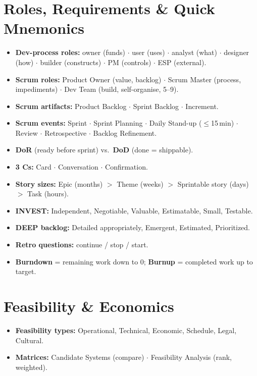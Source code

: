 \documentclass[hidelinks]{article}
\begin{document}
\section{Roles, Requirements \& Quick Mnemonics}
\begin{itemize}
  \item \textbf{Dev-process roles:} owner (funds) $\cdot$ user (uses) $\cdot$ analyst (what) $\cdot$
        designer (how) $\cdot$ builder (constructs) $\cdot$ PM (controls) $\cdot$ ESP (external).
  \item \textbf{Scrum roles:} Product Owner (value, backlog) $\cdot$ Scrum Master (process,
        impediments) $\cdot$ Dev Team (build, self-organise, 5--9).
  \item \textbf{Scrum artifacts:} Product Backlog $\cdot$ Sprint Backlog $\cdot$ Increment.
  \item \textbf{Scrum events:} Sprint $\cdot$ Sprint Planning $\cdot$ Daily Stand-up ($\le$15\,min)
        $\cdot$ Review $\cdot$ Retrospective $\cdot$ Backlog Refinement.
  \item \textbf{DoR} (ready before sprint) vs.\ \textbf{DoD} (done = shippable).
  \item \textbf{3 Cs:} Card $\cdot$ Conversation $\cdot$ Confirmation.
  \item \textbf{Story sizes:} Epic (months) $>$ Theme (weeks) $>$ Sprintable story (days) $>$ Task (hours).
  \item \textbf{INVEST:} Independent, Negotiable, Valuable, Estimatable, Small, Testable.
  \item \textbf{DEEP backlog:} Detailed appropriately, Emergent, Estimated, Prioritized.
  \item \textbf{Retro questions:} continue / stop / start.
  \item \textbf{Burndown} = remaining work down to 0; \textbf{Burnup} = completed work up to target.
\end{itemize}

\section{Feasibility \& Economics}
\begin{itemize}
  \item \textbf{Feasibility types:} Operational, Technical, Economic, Schedule, Legal, Cultural.
  \item \textbf{Matrices:} Candidate Systems (compare) $\cdot$ Feasibility Analysis (rank, weighted).
\end{itemize}
\noindent{\color{capri}
\[ PV=\frac{FV}{(1+i)^n}\quad
   \text{ROI}=\frac{B-C}{C}\cdot 100\%\quad
   \text{NPV}=\sum_{t=0}^{n}\frac{B_t-C_t}{(1+i)^t}\;(\text{accept if }>0) \]
\[ \text{People}=\frac{\text{person-months}}{\text{months}}\quad
   \text{Comm.\ lines}=\frac{n(n-1)}{2}\quad
   \text{Sprints}=\frac{\text{size}}{\text{velocity}} \]
}
\end{document}
